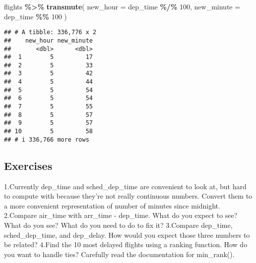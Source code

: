 \documentclass[
]{article}
\newenvironment{Shaded}{\begin{snugshade}}{\end{snugshade}}
\newcommand{\AttributeTok}[1]{\textcolor[rgb]{0.13,0.29,0.53}{#1}}
\newcommand{\DecValTok}[1]{\textcolor[rgb]{0.00,0.00,0.81}{#1}}
\newcommand{\FunctionTok}[1]{\textcolor[rgb]{0.13,0.29,0.53}{\textbf{#1}}}
\newcommand{\NormalTok}[1]{#1}
\newcommand{\SpecialCharTok}[1]{\textcolor[rgb]{0.81,0.36,0.00}{\textbf{#1}}}
\begin{document}
\begin{Shaded}
\begin{Highlighting}[]
\NormalTok{flights }\SpecialCharTok{\%\textgreater{}\%} \FunctionTok{transmute}\NormalTok{(}
              \AttributeTok{new\_hour =}\NormalTok{ dep\_time }\SpecialCharTok{\%/\%} \DecValTok{100}\NormalTok{,}
              \AttributeTok{new\_minute =}\NormalTok{ dep\_time }\SpecialCharTok{\%\%} \DecValTok{100}
\NormalTok{            )}
\end{Highlighting}
\end{Shaded}

\begin{verbatim}
## # A tibble: 336,776 x 2
##    new_hour new_minute
##       <dbl>      <dbl>
##  1        5         17
##  2        5         33
##  3        5         42
##  4        5         44
##  5        5         54
##  6        5         54
##  7        5         55
##  8        5         57
##  9        5         57
## 10        5         58
## # i 336,766 more rows
\end{verbatim}

\hypertarget{exercises-1}{%
\subsection{Exercises}\label{exercises-1}}

1.Currently dep\_time and sched\_dep\_time are convenient to look at,
but hard to compute with because they're not really continuous numbers.
Convert them to a more convenient representation of number of minutes
since midnight. 2.Compare air\_time with arr\_time - dep\_time. What do
you expect to see? What do you see? What do you need to do to fix it?
3.Compare dep\_time, sched\_dep\_time, and dep\_delay. How would you
expect those three numbers to be related? 4.Find the 10 most delayed
flights using a ranking function. How do you want to handle ties?
Carefully read the documentation for min\_rank().
\end{document}

